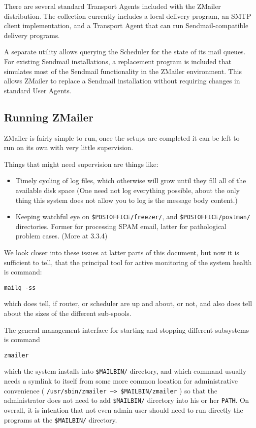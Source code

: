 There are several standard Transport Agents included with the ZMailer
distribution.  The collection currently includes a local delivery program,
an SMTP client implementation, and a Transport Agent that can run
Sendmail-compatible delivery programs.

A separate utility allows querying the Scheduler for the state of its mail
queues.  For existing Sendmail installations, a replacement program is
included that simulates most of the Sendmail functionality in the ZMailer
environment.  This allows ZMailer to replace a Sendmail installation
without requiring changes in standard User Agents.




\subsection{Running ZMailer}

ZMailer is fairly simple to run, once the setups are completed
it can be left to run on its own with very little supervision.

Things that might need supervision are things like:
\begin{itemize}
\item Timely cycling of log files, which otherwise will grow until
they fill all of the available disk space  (One need not log
everything possible, about the only thing this system does not
allow you to log is the message body content.)
\item Keeping watchful eye on  {\tt \$POSTOFFICE/freezer/}, and 
{\tt \$POSTOFFICE/postman/}
directories.  Former for processing SPAM email, latter for
pathological problem cases.  (More at  3.3.4)
\end{itemize}

We look closer into these issues at latter parts of this document,
but now it is sufficient to tell, that the principal tool for active
monitoring of the system health is command:
\begin{verbatim}
mailq -ss
\end{verbatim}

which does tell, if router, or scheduler are up and about, or not,
and also does tell about the sizes of the different sub-spools.

The general management interface for starting and stopping different
subsystems is command
\begin{verbatim}
zmailer
\end{verbatim}

which the system installs into {\tt \$MAILBIN/} directory, and which command usually needs a symlink to itself from some more common location for
administrative convenience
( {\tt /usr/sbin/zmailer --> \$MAILBIN/zmailer} )
so that the administrator does not need to add  {\tt \$MAILBIN/}  directory
into his or her {\tt PATH}.   On overall, it is intention that not even 
admin
user should need to run directly the programs at the {\tt \$MAILBIN/} directory.

